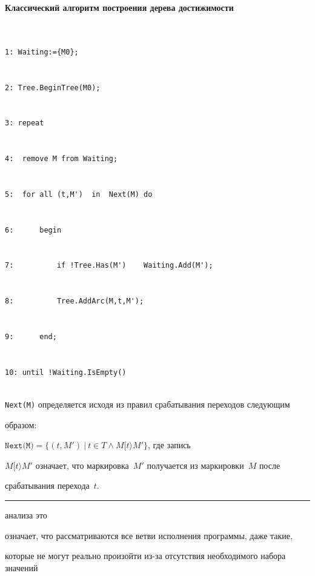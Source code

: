 {\small \noindent


\textbf{Классический алгоритм построения дерева достижимости}




\begin{verbatim}


1: Waiting:={M0};


2: Tree.BeginTree(M0);


3: repeat


4:  remove M from Waiting;  


5:  for all (t,M')  in  Next(M) do


6:      begin


7:          if !Tree.Has(M')    Waiting.Add(M');


8:          Tree.AddArc(M,t,M');


9:      end;


10: until !Waiting.IsEmpty()


\end{verbatim}


\texttt{Next(M)} определяется исходя из правил срабатывания переходов сле\-ду\-ющим 


образом:


$\texttt{Next(M)} = \{(t, M')  ~|~ t \in T \wedge M[t\rangle  M' \}$, где запись 


$M[t\rangle M'$ означает, что маркировка~$M'$ получается из маркировки~$M$ после 


срабатывания перехода~$t$.


}








\vspace*{6pt}





\hrule





\vspace*{24pt}





\noindent


 анализа это 


означает, что рас\-смат\-ри\-ва\-ют\-ся все вет\-ви исполнения программы, даже такие, 


которые не могут реально произойти из-за отсутствия необходимого набора значений 


